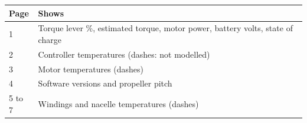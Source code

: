 \begin{tabularx}{\textwidth}{@{}l>{\raggedright\arraybackslash}X@{}}
\toprule
\textbf{Page} & \textbf{Shows} \\
\midrule
1 & Torque lever \%, estimated torque, motor power, battery volts, state of charge \\
2 & Controller temperatures (dashes: not modelled) \\
3 & Motor temperatures (dashes) \\
4 & Software versions and propeller pitch \\
5 to 7 & Windings and nacelle temperatures (dashes) \\
\bottomrule
\end{tabularx}
